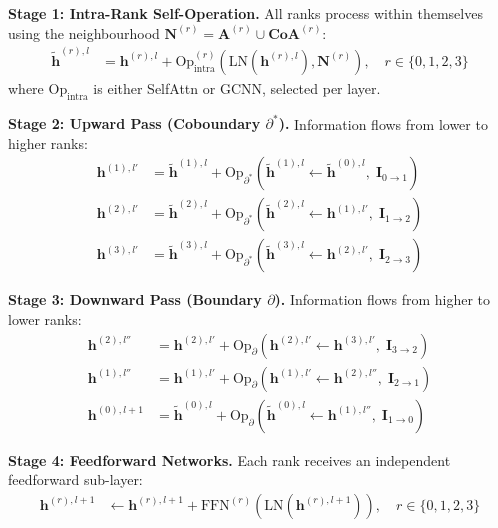 \documentclass{article}
\begin{document}
\begin{tcolorbox}[colframe=black, colback=white!5, title=Single META Layer $l$ (Attention or GCNN variant), width=\linewidth]

\textbf{Stage 1: Intra-Rank Self-Operation.} All ranks process within themselves using the neighbourhood $\mathbf{N}^{(r)} = \mathbf{A}^{(r)} \cup \mathbf{CoA}^{(r)}$:
\begin{align}
    \tilde{\mathbf{h}}^{(r),l} &= \mathbf{h}^{(r),l} + \text{Op}^{(r)}_{\text{intra}}(\text{LN}(\mathbf{h}^{(r),l}), \mathbf{N}^{(r)}), \quad r \in \{0, 1, 2, 3\}
\end{align}
where $\text{Op}_{\text{intra}}$ is either SelfAttn or GCNN, selected per layer.

\textbf{Stage 2: Upward Pass (Coboundary $\partial^*$).} Information flows from lower to higher ranks:
\begin{align}
    \mathbf{h}^{(1),l'} &= \tilde{\mathbf{h}}^{(1),l} + \text{Op}_{\partial^*}(\tilde{\mathbf{h}}^{(1),l} \leftarrow \tilde{\mathbf{h}}^{(0),l}, \; \mathbf{I}_{0 \to 1}) \\
    \mathbf{h}^{(2),l'} &= \tilde{\mathbf{h}}^{(2),l} + \text{Op}_{\partial^*}(\tilde{\mathbf{h}}^{(2),l} \leftarrow \mathbf{h}^{(1),l'}, \; \mathbf{I}_{1 \to 2}) \\
    \mathbf{h}^{(3),l'} &= \tilde{\mathbf{h}}^{(3),l} + \text{Op}_{\partial^*}(\tilde{\mathbf{h}}^{(3),l} \leftarrow \mathbf{h}^{(2),l'}, \; \mathbf{I}_{2 \to 3})
\end{align}

\textbf{Stage 3: Downward Pass (Boundary $\partial$).} Information flows from higher to lower ranks:
\begin{align}
    \mathbf{h}^{(2),l''} &= \mathbf{h}^{(2),l'} + \text{Op}_{\partial}(\mathbf{h}^{(2),l'} \leftarrow \mathbf{h}^{(3),l'}, \; \mathbf{I}_{3 \to 2}) \\
    \mathbf{h}^{(1),l''} &= \mathbf{h}^{(1),l'} + \text{Op}_{\partial}(\mathbf{h}^{(1),l'} \leftarrow \mathbf{h}^{(2),l''}, \; \mathbf{I}_{2 \to 1}) \\
    \mathbf{h}^{(0),l+1} &= \tilde{\mathbf{h}}^{(0),l} + \text{Op}_{\partial}(\tilde{\mathbf{h}}^{(0),l} \leftarrow \mathbf{h}^{(1),l''}, \; \mathbf{I}_{1 \to 0})
\end{align}

\textbf{Stage 4: Feedforward Networks.} Each rank receives an independent feedforward sub-layer:
\begin{align}
    \mathbf{h}^{(r),l+1} &\leftarrow \mathbf{h}^{(r),l+1} + \text{FFN}^{(r)}(\text{LN}(\mathbf{h}^{(r),l+1})), \quad r \in \{0, 1, 2, 3\}
\end{align}
\end{tcolorbox}
\end{document}
